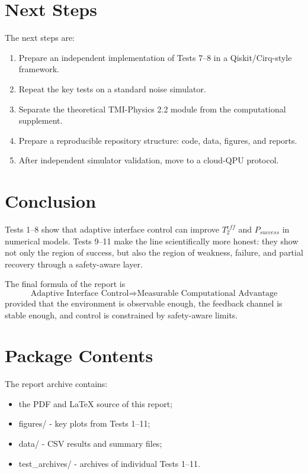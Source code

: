 \documentclass[12pt,a4paper]{article}
\begin{document}
\section{Next Steps}

The next steps are:
\begin{enumerate}[label=\arabic*.]
\item Prepare an independent implementation of Tests 7--8 in a Qiskit/Cirq-style framework.
\item Repeat the key tests on a standard noise simulator.
\item Separate the theoretical TMI-Physics 2.2 module from the computational supplement.
\item Prepare a reproducible repository structure: code, data, figures, and reports.
\item After independent simulator validation, move to a cloud-QPU protocol.
\end{enumerate}

\section{Conclusion}

Tests 1--8 show that adaptive interface control can improve $T_2^{eff}$ and $P_{success}$ in numerical models. Tests 9--11 make the line scientifically more honest: they show not only the region of success, but also the region of weakness, failure, and partial recovery through a safety-aware layer.

The final formula of the report is
\[
\boxed{
\text{Adaptive Interface Control}
\Rightarrow
\text{Measurable Computational Advantage}
}
\]
provided that the environment is observable enough, the feedback channel is stable enough, and control is constrained by safety-aware limits.

\appendix
\section{Package Contents}

The report archive contains:
\begin{itemize}
\item the PDF and LaTeX source of this report;
\item figures/ - key plots from Tests 1--11;
\item data/ - CSV results and summary files;
\item test\_archives/ - archives of individual Tests 1--11.
\end{itemize}
\end{document}
